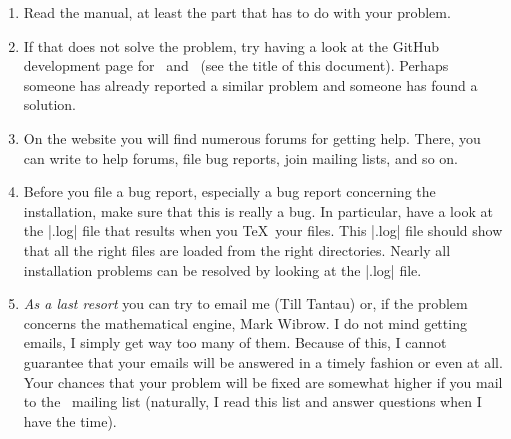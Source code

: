 \begin{enumerate}
    \item Read the manual, at least the part that has to do with your
        problem.
    \item If that does not solve the problem, try having a look at the
        GitHub development page for \pgfname\ and \tikzname\ (see the
        title of this document). Perhaps someone has already reported a
        similar problem and someone has found a solution.
    \item On the website you will find numerous forums for getting help.
        There, you can write to help forums, file bug reports, join mailing
        lists, and so on.
    \item Before you file a bug report, especially a bug report concerning
        the installation, make sure that this is really a bug. In particular,
        have a look at the |.log| file that results when you \TeX\ your
        files. This |.log| file should show that all the right files are
        loaded from the right directories. Nearly all installation problems
        can be resolved by looking at the |.log| file.
    \item \emph{As a last resort} you can try to email me (Till Tantau) or,
        if the problem concerns the mathematical engine, Mark Wibrow. I do
        not mind getting emails, I simply get way too many of them. Because
        of this, I cannot guarantee that your emails will be answered in a
        timely fashion or even at all. Your chances that your problem will
        be fixed are somewhat higher if you mail to the \pgfname\ mailing
        list (naturally, I read this list and answer questions when I have
        the time).
\end{enumerate}
